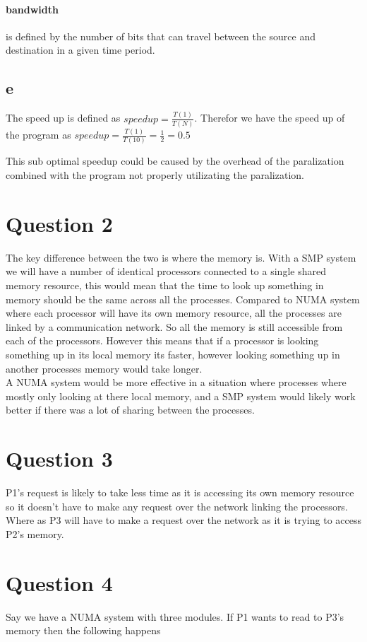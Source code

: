 \documentclass[a4paper, 12pt]{article}
\begin{document}
			\paragraph{bandwidth} is defined by   the number of bits that can travel between the source and destination in a given time period.
		
		\subsection{e}
			The speed up is defined as $speedup = \frac{T(1)}{T(N)}$. Therefor we have the speed up of the program as $speedup = \frac{T(1)}{T(10)} = \frac{1}{2} = 0.5$
			
			This sub optimal speedup could be caused by the overhead of the paralization combined with the program not properly utilizating the paralization.
  	
  	\section{Question 2}
  		The key difference between the two is where the memory is. With a SMP system we will have a number of identical processors connected to a single shared memory resource, this would mean that the time to look up something in memory should be the same across all the processes. Compared to NUMA system where each processor will have its own memory resource, all the processes are linked by a communication network. So all the memory is still accessible from each of the processors. However this means that if a processor is looking something up in its local memory its faster, however looking something up in another processes memory would take longer.\\
  		
  		A NUMA system would be more effective in a situation where processes where mostly only looking at there local memory, and a SMP system would likely work better if there was a lot of sharing between the processes.
  	
  	\section{Question 3}
		P1's request is likely to take less time as it is accessing its own memory resource so it doesn't have to make any request over the network linking the processors. Where as P3 will have to make a request over the network as it is trying to access P2's memory.  		
  		
  	\section{Question 4}
  		Say we have a NUMA system with three modules. If P1 wants to read to P3's memory then the following happens
  		
\end{document}
